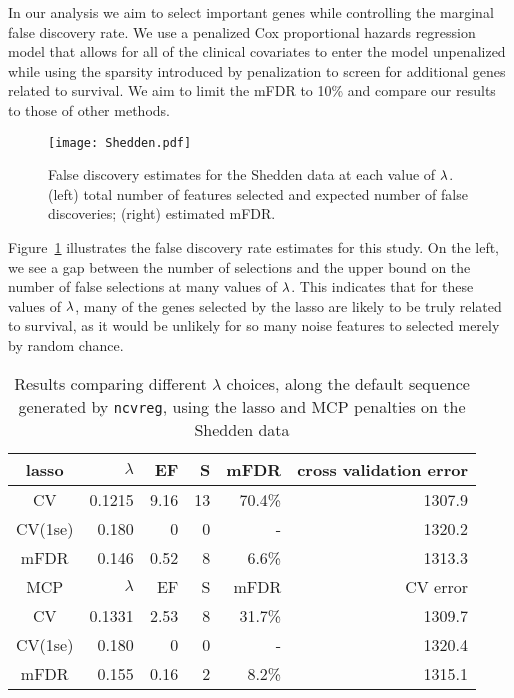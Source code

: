 In our analysis we aim to select important genes while controlling the marginal false discovery rate.  We use a penalized Cox proportional hazards regression model that allows for all of the clinical covariates to enter the model unpenalized while using the sparsity introduced by penalization to screen for additional genes related to survival.  We aim to limit the mFDR to 10\% and compare our results to those of other methods.

\begin{figure} [!htb]
 \centering
  \texttt{[image: Shedden.pdf]}
  \caption{\label{Fig:Shedden} False discovery estimates for the Shedden data at each value of $\lambda$.  (left) total number of features selected and expected number of false discoveries; (right) estimated mFDR.}
\end{figure}

Figure~\ref{Fig:Shedden} illustrates the false discovery rate estimates for this study.  On the left, we see a gap between the number of selections and the upper bound on the number of false selections at many values of $\lambda$.  This indicates that for these values of $\lambda$, many of the genes selected by the lasso are likely to be truly related to survival, as it would be unlikely for so many noise features to selected merely by random chance.

\begin{table}[htb!]
\centering
\begin{tabular}{c | r r r r r }
  \hline
lasso & $\lambda$ & EF & S & mFDR & cross validation error \\ 
	\hline
	CV & 0.1215 & 9.16 & 13 & 70.4\% &  1307.9 \\
	CV(1se) & 0.180  &  0 &  0 &  -  & 1320.2 \\
	mFDR & 0.146 & 0.52 & 8 & 6.6\% & 1313.3 \\
\hline
MCP & $\lambda$ & EF & S & mFDR  & CV error \\
	\hline
	CV & 0.1331 & 2.53 & 8 & 31.7\% &  1309.7 \\
	CV(1se) & 0.180 & 0 & 0 & - &  1320.4 \\
	mFDR & 0.155 & 0.16 & 2 & 8.2\% &  1315.1 \\
		\hline
\end{tabular}
\caption{\label{Tab:shedden} Results comparing different $\lambda$ choices, along the default sequence generated by {\tt ncvreg}, using the lasso and MCP penalties on the Shedden data }
\end{table}

